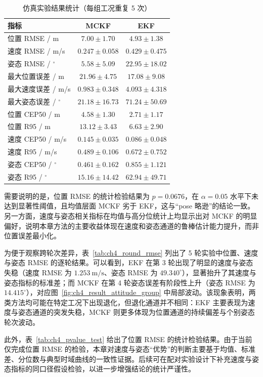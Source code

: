 \begin{table}[htbp]
\centering
\caption{仿真实验结果统计（每组工况重复 5 次）}
\label{tab:ch4_result_stats}
\begin{tabular}{lcc}
\toprule[1.5pt]
指标 & MCKF & EKF \\
\midrule[1pt]
位置 RMSE / m & $7.00\pm1.70$ & $4.93\pm1.38$ \\
速度 RMSE / m/s & $0.247\pm0.058$ & $0.429\pm0.475$ \\
姿态 RMSE / $^{\circ}$ & $5.58\pm5.09$ & $22.95\pm18.02$ \\
最大位置误差 / m & $21.96\pm4.75$ & $17.08\pm9.08$ \\
最大速度误差 / m/s & $0.983\pm0.348$ & $4.093\pm4.318$ \\
最大姿态误差 / $^{\circ}$ & $21.18\pm16.73$ & $71.24\pm50.69$ \\
位置 CEP50 / m & $4.58\pm1.30$ & $2.71\pm1.17$ \\
位置 R95 / m & $13.12\pm3.43$ & $6.63\pm2.90$ \\
速度 CEP50 / m/s & $0.145\pm0.035$ & $0.086\pm0.048$ \\
速度 R95 / m/s & $0.489\pm0.106$ & $0.672\pm0.752$ \\
姿态 CEP50 / $^{\circ}$ & $0.461\pm0.162$ & $0.855\pm1.121$ \\
姿态 R95 / $^{\circ}$ & $15.16\pm14.42$ & $62.94\pm49.71$ \\
\bottomrule[1.5pt]
\end{tabular}
\end{table}

需要说明的是，位置 RMSE 的统计检验结果为 $p=0.0676$，在 $\alpha=0.05$ 水平下未达到显著性阈值，且均值层面 MCKF 劣于 EKF，这与“pose 略逊”的结论一致。另一方面，速度与姿态相关指标在均值与高分位统计上均显示出对 MCKF 的明显偏好，说明本章方法的主要收益体现在速度和姿态通道的鲁棒估计能力提升，而非位置误差最小化。

为便于观察跨轮次差异，表~\ref{tab:ch4_round_rmse} 列出了 5 轮实验中位置、速度与姿态 RMSE 的逐轮结果。可以看到，EKF 在第 3 轮出现了明显的速度与姿态失稳（速度 RMSE 为 $1.253~\mathrm{m/s}$、姿态 RMSE 为 $49.340^{\circ}$），显著抬升了其速度与姿态指标的标准差；而 MCKF 在第 4 轮姿态误差有阶段性上升（姿态 RMSE 为 $14.415^{\circ}$），对应图~\ref{fig:ch4_result_attitude_group} 中局部波动。该现象表明，两类方法均可能在特定工况下出现退化，但退化通道并不相同：EKF 主要表现为速度与姿态通道的突发失稳，MCKF 则更多体现为位置通道的持续偏差与个别姿态轮次波动。

此外，表~\ref{tab:ch4_pvalue_test} 给出了位置 RMSE 的统计检验结果。由于当前仅完成位置 RMSE 的检验，本章对速度与姿态“优势”的判断主要基于均值、标准差、分位数与典型时域曲线的一致性证据。后续可在配对实验设计下补充速度与姿态指标的同口径假设检验，以进一步增强结论的统计严谨性。

